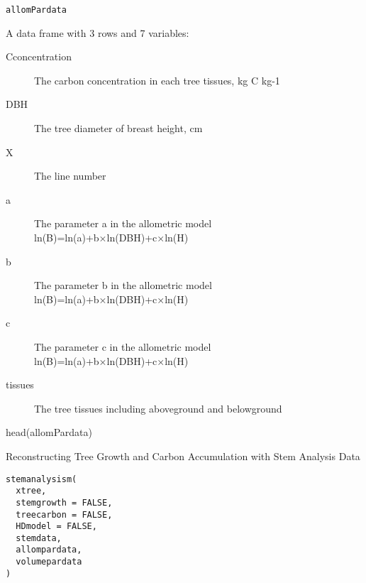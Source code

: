 \documentclass[a4paper]{book}
\begin{document}
%
\begin{Usage}
\begin{verbatim}
allomPardata
\end{verbatim}
\end{Usage}
%
\begin{Format}
A data frame with 3 rows and 7 variables:
\begin{description}

\item[Cconcentration] The carbon concentration in each tree tissues, kg C kg-1
\item[DBH] The tree diameter of breast height, cm
\item[X] The line number
\item[a] The parameter a in the allometric model ln(B)=ln(a)+b×ln(DBH)+c×ln(H)
\item[b] The parameter b in the allometric model ln(B)=ln(a)+b×ln(DBH)+c×ln(H)
\item[c] The parameter c in the allometric model ln(B)=ln(a)+b×ln(DBH)+c×ln(H)
\item[tissues] The tree tissues including aboveground and belowground

\end{description}

\end{Format}
%
\begin{Examples}
\begin{ExampleCode}
head(allomPardata)
\end{ExampleCode}
\end{Examples}
%
\begin{Description}\relax
Reconstructing Tree Growth and Carbon Accumulation with Stem Analysis Data
\end{Description}
%
\begin{Usage}
\begin{verbatim}
stemanalysism(
  xtree,
  stemgrowth = FALSE,
  treecarbon = FALSE,
  HDmodel = FALSE,
  stemdata,
  allompardata,
  volumepardata
)
\end{verbatim}
\end{Usage}
%
\end{document}
